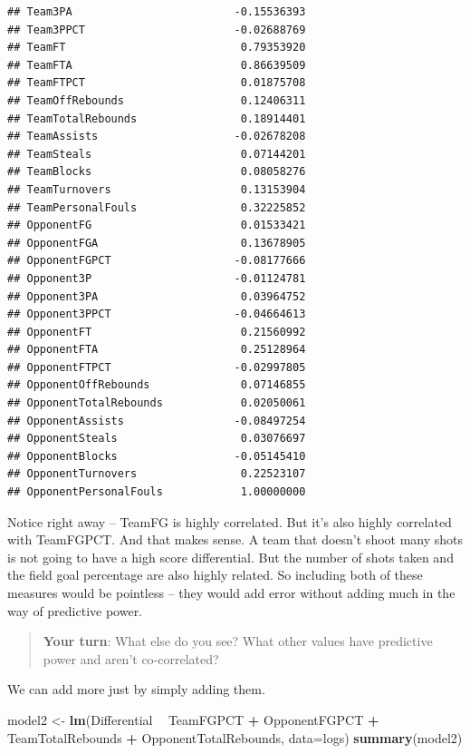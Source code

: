 \documentclass[
]{book}
\newenvironment{Shaded}{\begin{snugshade}}{\end{snugshade}}
\newcommand{\DataTypeTok}[1]{\textcolor[rgb]{0.13,0.29,0.53}{#1}}
\newcommand{\KeywordTok}[1]{\textcolor[rgb]{0.13,0.29,0.53}{\textbf{#1}}}
\newcommand{\NormalTok}[1]{#1}
\newcommand{\OperatorTok}[1]{\textcolor[rgb]{0.81,0.36,0.00}{\textbf{#1}}}
\newcommand{\StringTok}[1]{\textcolor[rgb]{0.31,0.60,0.02}{#1}}
\begin{document}
\begin{verbatim}
## Team3PA                         -0.15536393
## Team3PPCT                       -0.02688769
## TeamFT                           0.79353920
## TeamFTA                          0.86639509
## TeamFTPCT                        0.01875708
## TeamOffRebounds                  0.12406311
## TeamTotalRebounds                0.18914401
## TeamAssists                     -0.02678208
## TeamSteals                       0.07144201
## TeamBlocks                       0.08058276
## TeamTurnovers                    0.13153904
## TeamPersonalFouls                0.32225852
## OpponentFG                       0.01533421
## OpponentFGA                      0.13678905
## OpponentFGPCT                   -0.08177666
## Opponent3P                      -0.01124781
## Opponent3PA                      0.03964752
## Opponent3PPCT                   -0.04664613
## OpponentFT                       0.21560992
## OpponentFTA                      0.25128964
## OpponentFTPCT                   -0.02997805
## OpponentOffRebounds              0.07146855
## OpponentTotalRebounds            0.02050061
## OpponentAssists                 -0.08497254
## OpponentSteals                   0.03076697
## OpponentBlocks                  -0.05145410
## OpponentTurnovers                0.22523107
## OpponentPersonalFouls            1.00000000
\end{verbatim}

Notice right away -- TeamFG is highly correlated. But it's also highly correlated with TeamFGPCT. And that makes sense. A team that doesn't shoot many shots is not going to have a high score differential. But the number of shots taken and the field goal percentage are also highly related. So including both of these measures would be pointless -- they would add error without adding much in the way of predictive power.

\begin{quote}
\textbf{Your turn}: What else do you see? What other values have predictive power and aren't co-correlated?
\end{quote}

We can add more just by simply adding them.

\begin{Shaded}
\begin{Highlighting}[]
\NormalTok{model2 <-}\StringTok{ }\KeywordTok{lm}\NormalTok{(Differential }\OperatorTok{~}\StringTok{ }\NormalTok{TeamFGPCT }\OperatorTok{+}\StringTok{ }\NormalTok{OpponentFGPCT }\OperatorTok{+}\StringTok{ }\NormalTok{TeamTotalRebounds }\OperatorTok{+}\StringTok{ }\NormalTok{OpponentTotalRebounds, }\DataTypeTok{data=}\NormalTok{logs)}
\KeywordTok{summary}\NormalTok{(model2)}
\end{Highlighting}
\end{Shaded}
\end{document}
